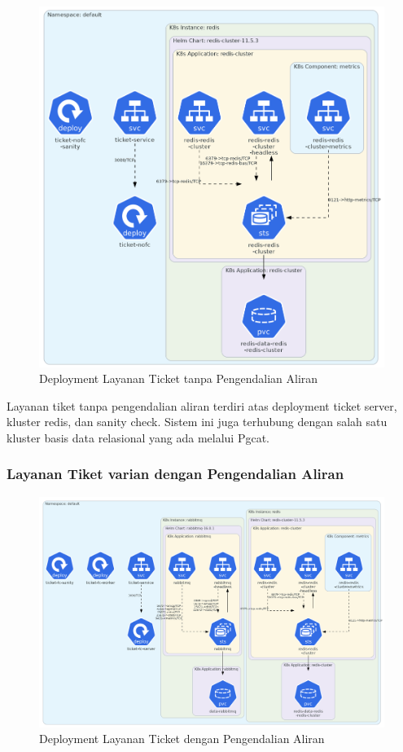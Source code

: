 \begin{figure}[htbp]
    \centering
    \includegraphics[width=1\textwidth]{resources/chapter-4/ticket-nofc.png}
    \caption{Deployment Layanan Ticket tanpa Pengendalian Aliran}
    \label{fig:deployment-ticket-nofc}
\end{figure}

Layanan tiket tanpa pengendalian aliran terdiri atas deployment ticket server, kluster redis, dan sanity check. Sistem ini juga terhubung dengan salah satu kluster basis data relasional yang ada melalui Pgcat.

\pagebreak

\subsubsection{Layanan Tiket varian dengan Pengendalian Aliran}

\begin{figure}[htbp]
    \centering
    \includegraphics[width=1\textwidth]{resources/chapter-4/ticket-fc.png}
    \caption{Deployment Layanan Ticket dengan Pengendalian Aliran}
    \label{fig:deployment-ticket-fc}
\end{figure}

